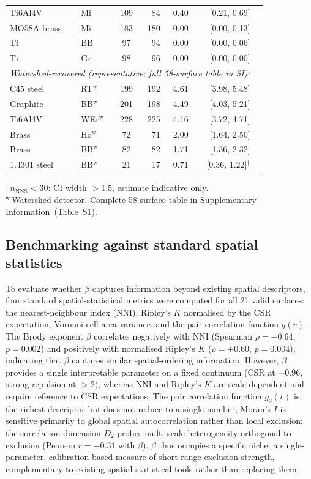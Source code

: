 \documentclass[final,3p,times,twocolumn]{elsarticle}
\theoremstyle{definition}
\begin{document}
\begin{table}[htbp]
\begin{tabular}{@{}llcrrrc@{}}
    Ti6Al4V & Mi & 109 & 84 & 0.40 & [0.21, 0.69] \\
    MO58A brass & Mi & 183 & 180 & 0.00 & [0.00, 0.13] \\
    Ti & BB & 97 & 94 & 0.00 & [0.00, 0.06] \\
    Ti & Gr & 98 & 96 & 0.00 & [0.00, 0.00] \\
    \midrule
    \multicolumn{6}{l}{\footnotesize\textit{Watershed-recovered (representative; full 58-surface table in SI):}} \\
    C45 steel & RT$^{\text{w}}$ & 199 & 192 & 4.61 & [3.98, 5.48] \\
    Graphite & BB$^{\text{w}}$ & 201 & 198 & 4.49 & [4.03, 5.21] \\
    Ti6Al4V & WEr$^{\text{w}}$ & 228 & 225 & 4.16 & [3.72, 4.71] \\
    Brass & Ho$^{\text{w}}$ & 72 & 71 & 2.00 & [1.64, 2.50] \\
    Brass & BB$^{\text{w}}$ & 82 & 82 & 1.71 & [1.36, 2.32] \\
    1.4301 steel & BB$^{\text{w}}$ & 21 & 17 & 0.71 & [0.36, 1.22]$^{\dagger}$ \\
    \bottomrule
  \end{tabular}

  \medskip
  {\footnotesize $^{\dagger}$\,$n_{\text{NNS}} < 30$: CI width $>1.5$, estimate indicative only. \\
  $^{\text{w}}$\,Watershed detector. Complete 58-surface table in Supplementary Information~(Table~S1).}
\end{table}

\subsection{Benchmarking against standard spatial statistics}

To evaluate whether $\beta$ captures information beyond
existing spatial descriptors, four standard spatial-statistical
metrics were computed for all 21 valid surfaces: the
nearest-neighbour index (NNI), Ripley's $K$ normalised by
the CSR expectation, Voronoi cell area variance, and the pair
correlation function $g(r)$. The Brody
exponent $\beta$ correlates negatively with NNI (Spearman
$\rho = -0.64$, $p = 0.002$) and positively with normalised
Ripley's $K$ ($\rho = +0.60$, $p = 0.004$), indicating that
$\beta$ captures similar spatial-ordering information.
However, $\beta$ provides a single interpretable parameter on a
fixed continuum (CSR at $\sim$0.96, strong repulsion at $>2$),
whereas NNI and Ripley's $K$ are scale-dependent and require
reference to CSR expectations. The pair correlation function
$g_2(r)$ is the richest descriptor but does not reduce to a single
number; Moran's $I$ is sensitive primarily to global spatial
autocorrelation rather than local exclusion; the correlation
dimension $D_2$ probes multi-scale heterogeneity orthogonal to
exclusion (Pearson $r = -0.31$ with $\beta$). $\beta$ thus
occupies a specific niche: a single-parameter, calibration-based
measure of short-range exclusion strength, complementary to
existing spatial-statistical tools rather than replacing them.
\end{document}
